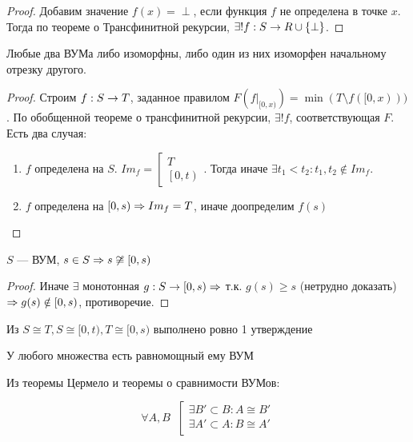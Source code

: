 \begin{proof}
    Добавим значение \(f(x) = \perp\), если функция \(f\) не определена в точке \(x\). Тогда по теореме о Трансфинитной рекурсии, \(\exists! f: S \rightarrow R \cup \{\perp\}\).
\end{proof}
\begin{theorem}
    Любые два ВУМа либо изоморфны, либо один из них изоморфен начальному отрезку другого.
\end{theorem}
\begin{proof}
    Строим \(f: S \rightarrow T\), заданное правилом \(F(f|_{[0, x)}) = \min (T \setminus f([0, x)))\). По обобщенной теореме о трансфинитной рекурсии, \(\exists! f\), соответствующая \(F\). Есть два случая:
    \begin{enumerate}
        \item \(f\) определена на \(S\). \(Im_f = \left[\begin{array}{l}
            T \\
            \left[0, t\right)
        \end{array}\right.\). Тогда  иначе \(\exists t_1 < t_2: t_1, t_2 \notin Im_f\).
        \item \(f\) определена на \([0, s) \Rightarrow Im_f = T\), иначе доопределим \(f(s)\)
    \end{enumerate}
\end{proof}

\begin{proposition}
    \(S\) --- ВУМ, \(s \in S \Rightarrow s \not\cong [0, s)\)
\end{proposition}
\begin{proof}
    Иначе \(\exists\) монотонная \(g: S \rightarrow [0, s) \Rightarrow\) т.к. \(g(s) \ge s\) (нетрудно доказать) \(\Rightarrow g(s) \notin [0, s)\), противоречие.
\end{proof}
\begin{corollary}
    Из \(S \cong T, S \cong [0, t), T \cong [0, s)\) выполнено ровно 1 утверждение
\end{corollary}

\begin{theorem}[Цермело]
    У любого множества есть равномощный ему ВУМ
\end{theorem}

Из теоремы Цермело и теоремы о сравнимости ВУМов:
\begin{corollary}
    \[\forall A, B\;\;\left[\begin{array}{l}
        \exists B' \subset B: A \cong B' \\
        \exists A' \subset A: B \cong A' \\
    \end{array}\right.\]
\end{corollary}

